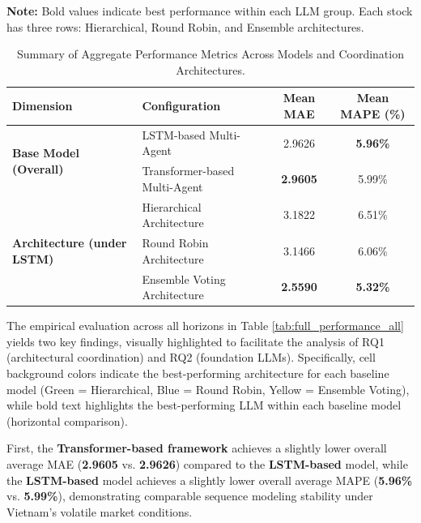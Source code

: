 {\vspace{0.3cm}
\footnotesize
\textbf{Note:} Bold values indicate best performance within each LLM group. Each stock has three rows: Hierarchical, Round Robin, and Ensemble architectures.
}

\begin{table}[h!]
\centering
\caption{Summary of Aggregate Performance Metrics Across Models and Coordination Architectures.}
\label{tab:aggregate_performance_summary}
\begin{tabular}{@{}llcc@{}}
\toprule
\textbf{Dimension} & \textbf{Configuration} & \textbf{Mean MAE} & \textbf{Mean MAPE (\%)} \\ \midrule
\multirow{2}{*}{\textbf{Base Model (Overall)}} & LSTM-based Multi-Agent & 2.9626 & \textbf{5.96\%} \\
                                             & Transformer-based Multi-Agent & \textbf{2.9605} & 5.99\% \\ \midrule
\multirow{3}{*}{\textbf{Architecture (under LSTM)}} & Hierarchical Architecture & 3.1822 & 6.51\% \\
                                                      & Round Robin Architecture & 3.1466 & 6.06\% \\
                                                      & Ensemble Voting Architecture & \textbf{2.5590} & \textbf{5.32\%} \\ \bottomrule
\end{tabular}
\end{table}

The empirical evaluation across all horizons in Table \ref{tab:full_performance_all} yields two key findings, visually highlighted to facilitate the analysis of RQ1 (architectural coordination) and RQ2 (foundation LLMs). Specifically, cell background colors indicate the best-performing architecture for each baseline model (Green = Hierarchical, Blue = Round Robin, Yellow = Ensemble Voting), while bold text highlights the best-performing LLM within each baseline model (horizontal comparison).

First, the \textbf{Transformer-based framework} achieves a slightly lower overall average MAE (\textbf{2.9605} vs. \textbf{2.9626}) compared to the \textbf{LSTM-based} model, while the \textbf{LSTM-based} model achieves a slightly lower overall average MAPE (\textbf{5.96\%} vs. \textbf{5.99\%}), demonstrating comparable sequence modeling stability under Vietnam's volatile market conditions.

